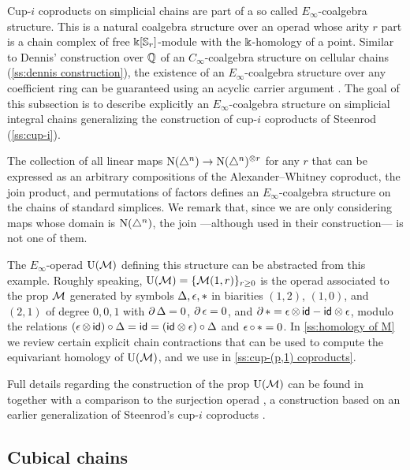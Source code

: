 Cup-$i$ coproducts on simplicial chains are part of a so called $E_\infty$-coalgebra structure.
This is a natural coalgebra structure over an operad whose arity $r$ part is a chain complex of free $\Bbbk[\mathbb{S}_r]$-module with the $\Bbbk$-homology of a point.
Similar to Dennis' construction over $\mathbb{Q}$ of an $C_\infty$-coalgebra structure on cellular chains (\cref{ss:dennis construction}), the existence of an $E_\infty$-coalgebra structure over any coefficient ring can be guaranteed using an acyclic carrier argument \cite{eilenberg1953acyclic}.
The goal of this subsection is to describe explicitly an $E_\infty$-coalgebra structure on simplicial integral chains generalizing the construction of cup-$i$ coproducts of Steenrod (\cref{ss:cup-i}).

The collection of all linear maps $\operatorname{N}(\triangle^n) \to \operatorname{N}(\triangle^n)^{\otimes r}$ for any $r$ that can be expressed as an arbitrary compositions of the Alexander--Whitney coproduct, the join product, and permutations of factors defines an $E_\infty$-coalgebra structure on the chains of standard simplices.
We remark that, since we are only considering maps whose domain is $\operatorname{N}(\triangle^n)$, the join ---although used in their construction--- is not one of them.

The $E_\infty$-operad ${\operatorname{U}(\mathcal{M})}$ defining this structure can be abstracted from this example.
Roughly speaking, ${\operatorname{U}(\mathcal{M})} = \{\mathcal{M}(1,r)\}_{r \geq 0}$ is the operad associated to the prop $\mathcal{M}$ generated by symbols $\operatorname{\Delta}, \operatorname{\epsilon}, \operatorname{\ast}$ in biarities $(1,2)$, $(1,0)$, and $(2,1)$ of degree $0,0,1$ with $\partial \operatorname{\Delta} = 0$, $\partial \operatorname{\epsilon} = 0$, and $\partial \operatorname{\ast} = \operatorname{\epsilon} \otimes \, \mathsf{id} - \mathsf{id} \otimes \operatorname{\epsilon}$, modulo the relations $(\operatorname{\epsilon} \otimes \, \mathsf{id}) \circ \operatorname{\Delta} = \mathsf{id} = (\mathsf{id} \otimes \operatorname{\epsilon}) \circ \operatorname{\Delta}$ and $\operatorname{\epsilon} \circ \, \ast = 0$.
In \cref{ss:homology of M} we review certain explicit chain contractions that can be used to compute the equivariant homology of ${\operatorname{U}(\mathcal{M})}$, and we use in \cref{ss:cup-(p,1) coproducts}.

Full details regarding the construction of the prop ${\operatorname{U}(\mathcal{M})}$ can be found in \cite{medina2020prop1} together with a comparison to the surjection operad \cite{mcclure2003multivariable}, a construction based on an earlier generalization of Steenrod's cup-$i$ coproducts \cite[\S4.5]{benson1998representations}.

\subsection{Cubical chains}

